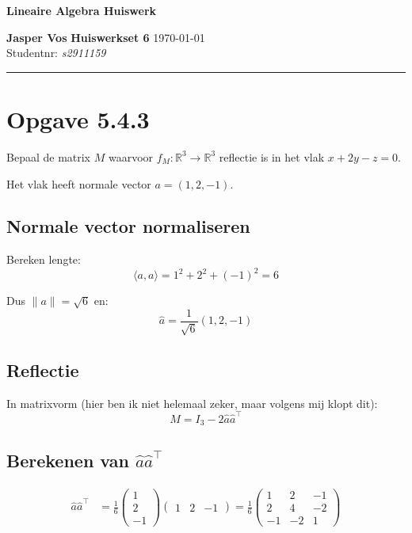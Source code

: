 \documentclass{article}
\newcommand{\R}{\mathbb{R}}
\begin{document}
{\Large \textbf{Lineaire Algebra Huiswerk}}

\bigskip

\textbf{Jasper Vos} \hfill \textbf{Huiswerkset 6} \hfill \today \\
Studentnr: \emph{s2911159}

\rule{\textwidth}{2pt}

\bigskip

\section*{Opgave 5.4.3}

Bepaal de matrix $M$ waarvoor $f_M: \R^3 \to \R^3$ reflectie is in het vlak $x + 2y - z = 0$.

Het vlak heeft normale vector $a = (1, 2, -1)$.

\subsection*{Normale vector normaliseren}

Bereken lengte:
\[ \langle a, a \rangle = 1^2 + 2^2 + (-1)^2 = 6 \]

Dus $\|a\| = \sqrt{6}$ en:
\[ \hat{a} = \frac{1}{\sqrt{6}}(1, 2, -1) \]

\subsection*{Reflectie}

In matrixvorm (hier ben ik niet helemaal zeker, maar volgens mij klopt dit):
\[ M = I_3 - 2\hat{a}\hat{a}^{\top} \]

\subsection*{Berekenen van $\hat{a}\hat{a}^{\top}$}

\begin{align*}
    \hat{a}\hat{a}^{\top} & = \frac{1}{6} \begin{pmatrix} 1 \\ 2 \\ -1 \end{pmatrix}
    \begin{pmatrix} 1 & 2 & -1 \end{pmatrix}
    = \frac{1}{6} \begin{pmatrix}
                      1  & 2  & -1 \\
                      2  & 4  & -2 \\
                      -1 & -2 & 1
                  \end{pmatrix}
\end{align*}
\end{document}
